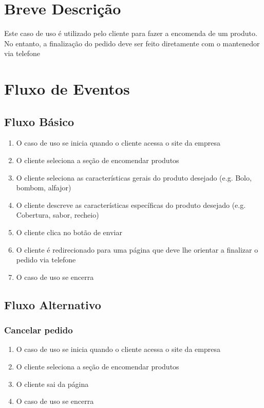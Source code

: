 \section{Breve Descrição}

Este caso de uso é utilizado pelo cliente para fazer a encomenda de um produto. No entanto, a finalização do pedido deve ser feito diretamente com o mantenedor via telefone


\section{Fluxo de Eventos}
\subsection{Fluxo Básico}

\begin{enumerate}
	\item O caso de uso se inicia quando o cliente acessa o site da empresa
	\item O cliente seleciona a seção de encomendar produtos
	\item O cliente seleciona as características gerais do produto desejado (e.g. Bolo, bombom, alfajor)
	\item O cliente descreve as características específicas do produto desejado (e.g. Cobertura, sabor, recheio)
	\item O cliente clica no botão de enviar
	\item O cliente é redirecionado para uma página que deve lhe orientar a finalizar o pedido via telefone
	\item O caso de uso se encerra
\end{enumerate}

\subsection{Fluxo Alternativo}
\subsubsection{Cancelar pedido}
\begin{enumerate}
	\item O caso de uso se inicia quando o cliente acessa o site da empresa
	\item O cliente seleciona a seção de encomendar produtos
	\item O cliente sai da página
	\item O caso de uso se encerra
\end{enumerate}


